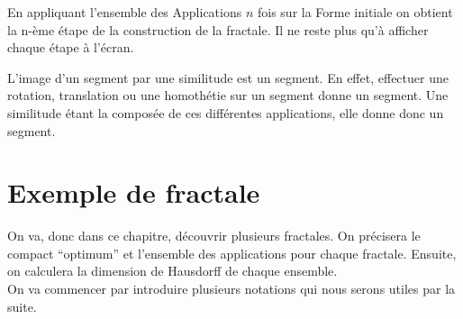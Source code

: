 \documentclass[a4paper, 12pt]{report}
\begin{document}
			\vspace{.2 cm}\hspace{.7 cm}
			En appliquant l'ensemble des Applications $n$ fois sur la Forme initiale on obtient la n-ème étape de la construction de la fractale. Il ne reste plus qu'à afficher chaque étape à l'écran.
	
			\begin{remark*}
				L'image d'un segment par une similitude est un segment. En effet, effectuer une rotation, translation ou une homothétie sur un segment donne un segment. Une similitude étant la composée de ces différentes applications, elle donne donc un segment.
			\end{remark*}

	
	\chapter{\bf Exemple de fractale}
		On va, donc dans ce chapitre, découvrir plusieurs fractales. On précisera le compact ``optimum'' et l'ensemble des applications pour chaque fractale. Ensuite, on calculera la dimension de Hausdorff de chaque ensemble.\\
		On va commencer par introduire plusieurs notations qui nous serons utiles par la suite.
\end{document}
